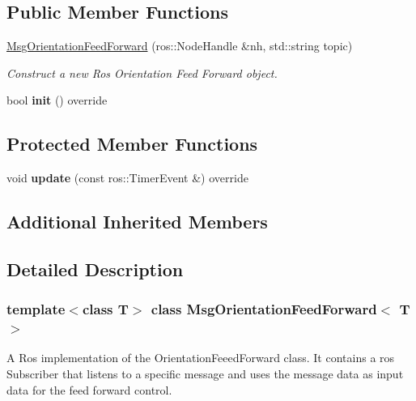 \subsection*{Public Member Functions}
\begin{DoxyCompactItemize}
\item 
\hyperlink{classMsgOrientationFeedForward_a487a69133c5098f14abeeeefe76306d1}{Msg\+Orientation\+Feed\+Forward} (ros\+::\+Node\+Handle \&nh, std\+::string topic)
\begin{DoxyCompactList}\small\item\em Construct a new Ros Orientation Feed Forward object. \end{DoxyCompactList}\item 
\mbox{\label{classMsgOrientationFeedForward_ae8216c873380686eb462826e3c48cf8e}} 
bool {\bfseries init} () override
\end{DoxyCompactItemize}
\subsection*{Protected Member Functions}
\begin{DoxyCompactItemize}
\item 
\mbox{\label{classMsgOrientationFeedForward_a78a74196a620861ae943af2d6d50c8af}} 
void {\bfseries update} (const ros\+::\+Timer\+Event \&) override
\end{DoxyCompactItemize}
\subsection*{Additional Inherited Members}


\subsection{Detailed Description}
\subsubsection*{template$<$class T$>$\newline
class Msg\+Orientation\+Feed\+Forward$<$ T $>$}

A Ros implementation of the Orientation\+Feeed\+Forward class. It contains a ros Subscriber that listens to a specific message and uses the message data as input data for the feed forward control. 


